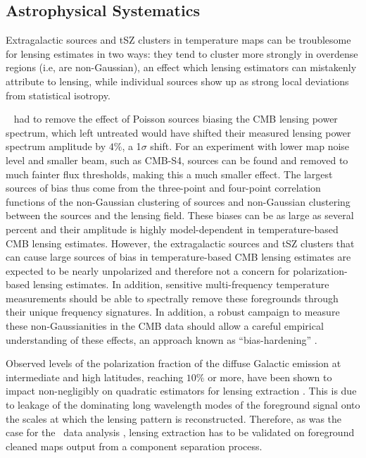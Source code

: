 \subsection{Astrophysical Systematics}\label{systAst}
	
Extragalactic sources and tSZ clusters in temperature maps can be troublesome for lensing estimates in two ways: they tend to cluster more strongly in overdense regions (i.e, are non-Gaussian), an effect which
lensing estimators can mistakenly attribute to lensing, while individual sources show up as strong local deviations from statistical isotropy.  

\planck\ \cite{Ade:2013tyw} had to remove the effect of Poisson sources biasing the CMB lensing power spectrum, which left untreated would have shifted their measured lensing power spectrum amplitude by $4\%$, a  1$\sigma$ shift.  For an experiment with lower map noise level and smaller beam, such as CMB-S4, sources can be found and removed to much fainter flux thresholds, making this a much smaller effect.  The largest sources of bias thus come from the three-point and four-point correlation functions of the non-Gaussian clustering of sources and non-Gaussian clustering between the sources and the lensing field.  These biases can be as large as several percent \cite{vanEngelen:2013rla, Osborne:2013nna} and their amplitude is highly model-dependent in temperature-based CMB lensing estimates. However, the extragalactic sources and tSZ clusters that can cause large sources of bias in temperature-based CMB lensing estimates are expected to be nearly unpolarized and therefore not a concern for polarization-based lensing estimates. In
addition, sensitive multi-frequency temperature measurements should be able to spectrally remove these foregrounds through their unique frequency
signatures. In addition, a robust campaign to measure these non-Gaussianities in the CMB data should allow a careful empirical understanding of these
effects, an approach known as ``bias-hardening'' \cite{Osborne:2013nna}.  

Observed levels of the polarization fraction of the diffuse Galactic emission at intermediate and high latitudes, reaching $10\%$ or more, 
have been shown to impact non-negligibly on quadratic estimators for lensing extraction \cite{Fantaye:2012ha}. 
This is due to leakage of the dominating long wavelength modes of the foreground signal onto the scales at which the lensing pattern is reconstructed. 
Therefore, as was the case for the \planck\ data analysis \cite{Ade:2015zua}, lensing extraction has to be validated on foreground cleaned maps output from a component separation process. 

